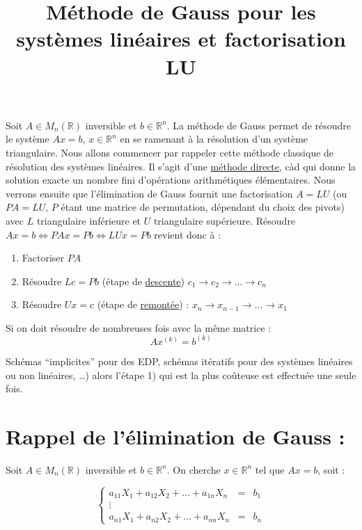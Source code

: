 \documentclass[a4paper,11pt]{article}
\title{\huge \bfseries Méthode de Gauss pour les systèmes linéaires et factorisation LU}
\date{}
\newcommand{\R}{\mathbb{R}}
\theoremstyle{plain} %
\begin{document}
\maketitle

Soit $A \in M_n(\R)$ inversible et $b \in \R^n$. La méthode de Gauss permet de résoudre le système $Ax=b$, $x \in \R^n$ en se ramenant à la résolution d'un système triangulaire.
Nous allons commencer par rappeler cette méthode classique de résolution des systèmes linéaires. Il s'agit d'une \underline{méthode directe}, càd qui donne la solution exacte un nombre fini d'opérations arithmétiques élémentaires.
Nous verrons ensuite que l'élimination de Gauss fournit une factorisation $A = LU$ (ou $PA = LU$, $P$ étant une matrice de permutation, dépendant du choix des pivots)
avec $L$ triangulaire inférieure et $U$ triangulaire supérieure.
Résoudre $Ax=b \Leftrightarrow PAx = Pb \Leftrightarrow LUx = Pb$ revient donc à :

\begin{enumerate}
    \item Factoriser $PA$
    \item Résoudre $Lc = Pb$ (étape de \underline{descente}) $c_1 \to c_2 \to \dots \to c_n$
    \item Résoudre $Ux = c$ (étape de \underline{remontée}) : $x_n \to x_{n-1} \to \dots \to x_1$
\end{enumerate}

Si on doit résoudre de nombreuses fois avec la même matrice :
\[
    Ax^{(k)}=b^{(k)}
\]

Schémas ``implicites'' pour des EDP, schémas itératifs pour des systèmes linéaires ou non linéaires, \dots) alors l'étape 1) qui est la plus coûteuse est effectuée une seule fois.


\section{Rappel de l'élimination de Gauss :}

Soit $A \in M_n(\R)$ inversible et $b \in \R^n$. On cherche $x \in \R^n$ tel que $Ax=b$, soit :

\begin{equation}
    \left\lbrace
    \begin{array}{ccc}
        a_{11}X_1 + a_{12}X_2+ \dots+ a_{1n}X_n & = & b_1 \\
        \vdots \\
        a_{n1}X_1 + a_{n2}X_2 + \dots + a_{nn}X_n & = & b_n
    \end{array}\right.
\end{equation}
\end{document}
